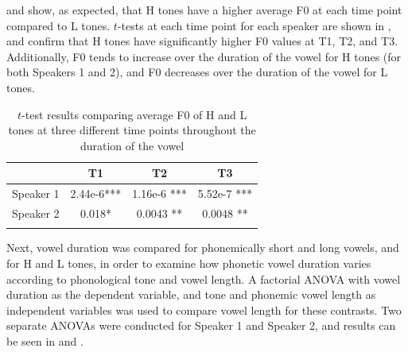 \documentclass[output=paper]{langscibook}
\begin{document}
 and  show, as expected, that H tones have a higher average F0 at each time point compared to L tones. $t$-tests at each time point for each speaker are shown in , and confirm that H tones have significantly higher F0 values at T1, T2, and T3. Additionally, F0 tends to increase over the duration of the vowel for H tones (for both Speakers 1 and 2), and F0 decreases over the duration of the vowel for L tones.


\begin{table}
\caption{$t$-test results comparing average F0 of H and L tones at three different time points throughout the duration of the vowel\label{tab:oakley:F0MovementTTest}}
\begin{tabular}{l *{3}{S[table-align-text-after=false,table-align-exponent=false,table-format=1.4e1{***}]}}
\lsptoprule
          & {T1} & {T2} & {T3}\\ 
\midrule
Speaker 1 & 2.44e-6{***}& 1.16e-6 {***} & 5.52e-7 {***}\\ 
Speaker 2 & 0.018{*}& 0.0043 {**} & 0.0048 {**}\\ 
\lspbottomrule
\end{tabular}
\end{table}

Next, vowel duration was compared for phonemically short and long vowels, and for H and L tones, in order to examine how phonetic vowel duration varies according to phonological tone and vowel length. A factorial ANOVA with vowel duration as the dependent variable, and tone and phonemic vowel length as independent variables was used to compare vowel length for these contrasts. Two separate ANOVAs were conducted for Speaker 1 and Speaker 2, and results can be seen in  and .
\end{document}
